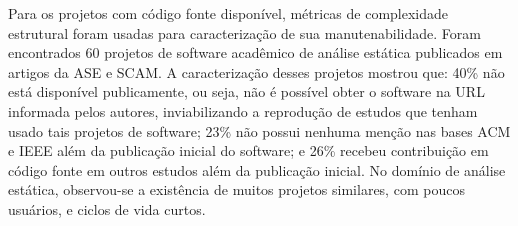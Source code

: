 Para os projetos com código fonte disponível, métricas de
complexidade estrutural foram usadas para caracterização de sua manutenabilidade.
Foram encontrados 60 projetos de software acadêmico de análise estática %
publicados em artigos da ASE e SCAM.
%
A caracterização desses projetos mostrou que: 
40\% não está disponível publicamente, ou seja, não é possível obter o software na URL informada pelos
autores, inviabilizando a reprodução de estudos que tenham usado tais projetos de software;
%
23\% não possui nenhuma menção nas bases
ACM e IEEE além da publicação inicial do software; 
e 26\% recebeu contribuição em código fonte em outros estudos
além da publicação inicial.
No domínio de análise estática, observou-se a existência de muitos projetos similares, com poucos
usuários, e ciclos de vida curtos.

%
%
